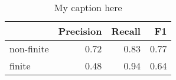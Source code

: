 \begin{table}[!ht]
\centering
\begin{tabular}{lrrr}
\toprule
{} &  Precision &  Recall &   F1 \\
\midrule
non-finite &       0.72 &    0.83 & 0.77 \\
finite     &       0.48 &    0.94 & 0.64 \\
\bottomrule
\end{tabular}
\caption{My caption here}
\label{tab:FINITENESS-ocd-combined-F1}
\end{table}